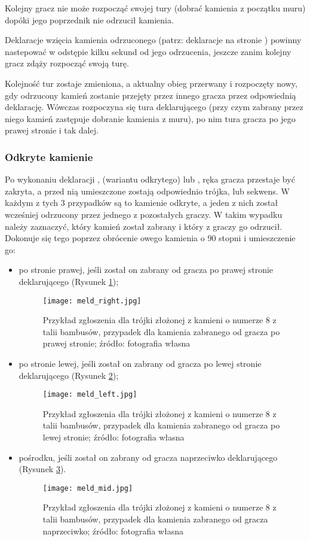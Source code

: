 Kolejny gracz nie może rozpocząć swojej tury (dobrać kamienia z początku muru)
dopóki jego poprzednik nie odrzucił kamienia. 

Deklaracje wzięcia kamienia odrzuconego (patrz: deklaracje na stronie
\pageref{deklaracje}) powinny nastepować w odstępie kilku sekund od jego
odrzucenia, jeszcze zanim kolejny gracz zdąży rozpocząć swoją turę.

Kolejność tur zostaje zmieniona, a aktualny obieg przerwany i rozpoczęty nowy,
gdy odrzucony kamień zostanie przejęty przez innego gracza przez odpowiednią deklarację.
Wówczas rozpoczyna się tura deklarującego (przy czym zabrany przez niego kamień
zastępuje dobranie kamienia z muru), po nim tura gracza po jego prawej stronie i
tak dalej.

\subsubsection{Odkryte kamienie}
Po wykonaniu deklaracji ,  (wariantu odkrytego) lub
, ręka gracza przestaje być zakryta, a przed nią
umieszczone zostają  odpowiednio trójka,  lub sekwens. W każdym z
tych 3 przypadków są to kamienie odkryte, a jeden z nich został wcześniej
odrzucony przez jednego z pozostałych graczy. W takim wypadku należy zaznaczyć,
który kamień został zabrany i który z graczy go odrzucił. Dokonuje się tego
poprzez obrócenie owego kamienia o 90 stopni i umieszczenie go:
\begin{itemize}
  \item po stronie prawej, jeśli został on zabrany od gracza po prawej stronie
  deklarującego (Rysunek \ref{fig:meldright});
  \begin{figure}[H]
  \centering
  \texttt{[image: meld\_right.jpg]}
  \caption{Przykład zgłoszenia  dla trójki złożonej z kamieni o
  numerze 8 z talii bambusów, przypadek dla kamienia zabranego od gracza po
  prawej stronie; źródło:
  fotografia własna}
  \label{fig:meldright}
  \end{figure}
  \item po stronie lewej, jeśli został on zabrany od gracza po lewej stronie
  deklarującego (Rysunek \ref{fig:meldleft});
  \begin{figure}[H]
  \centering
  \texttt{[image: meld\_left.jpg]}
  \caption{Przykład zgłoszenia  dla trójki złożonej z kamieni o
  numerze 8 z talii bambusów, przypadek dla kamienia zabranego od gracza po
  lewej stronie; źródło: fotografia własna}
  \label{fig:meldleft}
  \end{figure}
  \item pośrodku, jeśli został on zabrany od gracza naprzeciwko deklarującego
  (Rysunek \ref{fig:meldmid}).
  \begin{figure}[H]
  \centering
  \texttt{[image: meld\_mid.jpg]}
  \caption{Przykład zgłoszenia  dla trójki złożonej z kamieni o
  numerze 8 z talii bambusów, przypadek dla kamienia zabranego od gracza
  naprzeciwko; źródło: fotografia własna}
  \label{fig:meldmid}
  \end{figure}
\end{itemize}
